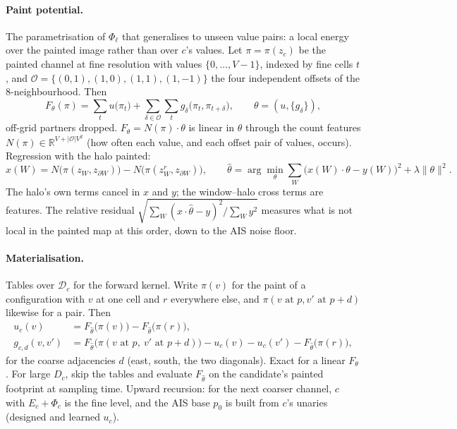 \documentclass[11pt]{article}
\newcommand{\R}{\mathbb{R}}
\newcommand{\1}{\mathds{1}}
\newcommand{\Dom}{\mathcal{D}}
\begin{document}
\paragraph{Paint potential.} The parametrisation of $\Phi_\ell$ that generalises to unseen
value pairs: a local energy over the painted image rather than over $c$'s values. Let
$\pi = \pi(z_c)$ be the painted channel at fine resolution with values $\{0, \dots, V-1\}$,
indexed by fine cells $t$, and $\mathcal{O} = \{(0,1), (1,0), (1,1), (1,-1)\}$ the four
independent offsets of the 8-neighbourhood. Then
\begin{equation}
  F_\theta(\pi) = \sum_{t} u\big(\pi_t\big) + \sum_{\delta \in \mathcal{O}} \sum_{t} g_\delta\big(\pi_t, \pi_{t+\delta}\big),
  \qquad \theta = (u, \{g_\delta\}),
\end{equation}
off-grid partners dropped. $F_\theta = N(\pi) \cdot \theta$ is linear in $\theta$ through the
count features $N(\pi) \in \R^{V + |\mathcal{O}| V^2}$ (how often each value, and each offset
pair of values, occurs). Regression with the halo painted:
\begin{equation}
  x(W) = N\big(\pi(z_W, z_{\partial W})\big) - N\big(\pi(z^{r}_W, z_{\partial W})\big), \qquad
  \hat\theta = \arg\min_\theta \sum_W \big(x(W)\!\cdot\!\theta - y(W)\big)^2 + \lambda \|\theta\|^2 .
\end{equation}
The halo's own terms cancel in $x$ and $y$; the window--halo cross terms are features. The
relative residual $\sqrt{\sum_W (x\cdot\hat\theta - y)^2 / \sum_W y^2}$ measures what is not local in
the painted map at this order, down to the AIS noise floor.

\paragraph{Materialisation.} Tables over $\Dom_c$ for the forward kernel. Write $\pi(v)$ for
the paint of a configuration with $v$ at one cell and $r$ everywhere else, and
$\pi(v \text{ at } p, v' \text{ at } p + d)$ likewise for a pair. Then
\begin{align}
  u_c(v) &= F_{\hat\theta}\big(\pi(v)\big) - F_{\hat\theta}\big(\pi(r)\big), \\
  g_{c,d}(v, v') &= F_{\hat\theta}\big(\pi(v \text{ at } p,\ v' \text{ at } p + d)\big) - u_c(v) - u_c(v') - F_{\hat\theta}\big(\pi(r)\big),
\end{align}
for the coarse adjacencies $d$ (east, south, the two diagonals). Exact for a linear $F_\theta$.
For large $D_c$, skip the tables and evaluate $F_{\hat\theta}$ on the candidate's painted
footprint at sampling time. Upward recursion: for the next coarser channel, $c$ with
$E_c + \Phi_c$ is the fine level, and the AIS base $p_0$ is built from $c$'s unaries (designed
and learned $u_c$).
\end{document}
